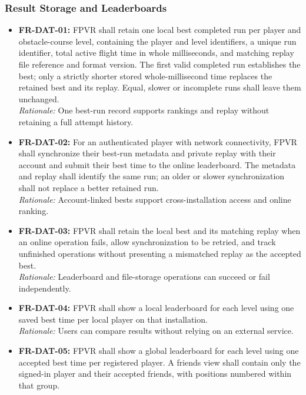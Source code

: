 \documentclass[12pt]{article}
\begin{document}
\subsubsection{Result Storage and Leaderboards}
\label{sec:s2-leaderboard}
\begin{itemize}
\item \hypertarget{req:FR-DAT-01}{}\textbf{FR-DAT-01:} FPVR shall retain one local best completed run per player and obstacle-course level, containing the player and level identifiers, a unique run identifier, total active flight time in whole milliseconds, and matching replay file reference and format version. The first valid completed run establishes the best; only a strictly shorter stored whole-millisecond time replaces the retained best and its replay. Equal, slower or incomplete runs shall leave them unchanged.\\
\textit{Rationale:} One best-run record supports rankings and replay without retaining a full attempt history.
\item \hypertarget{req:FR-DAT-02}{}\textbf{FR-DAT-02:} For an authenticated player with network connectivity, FPVR shall synchronize their best-run metadata and private replay with their account and submit their best time to the online leaderboard. The metadata and replay shall identify the same run; an older or slower synchronization shall not replace a better retained run.\\
\textit{Rationale:} Account-linked bests support cross-installation access and online ranking.
\item \hypertarget{req:FR-DAT-03}{}\textbf{FR-DAT-03:} FPVR shall retain the local best and its matching replay when an online operation fails, allow synchronization to be retried, and track unfinished operations without presenting a mismatched replay as the accepted best.\\
\textit{Rationale:} Leaderboard and file-storage operations can succeed or fail independently.
\item \hypertarget{req:FR-DAT-04}{}\textbf{FR-DAT-04:} FPVR shall show a local leaderboard for each level using one saved best time per local player on that installation.\\
\textit{Rationale:} Users can compare results without relying on an external service.
\item \hypertarget{req:FR-DAT-05}{}\textbf{FR-DAT-05:} FPVR shall show a global leaderboard for each level using one accepted best time per registered player. A friends view shall contain only the signed-in player and their accepted friends, with positions numbered within that group.\\

\end{itemize}
\end{document}

